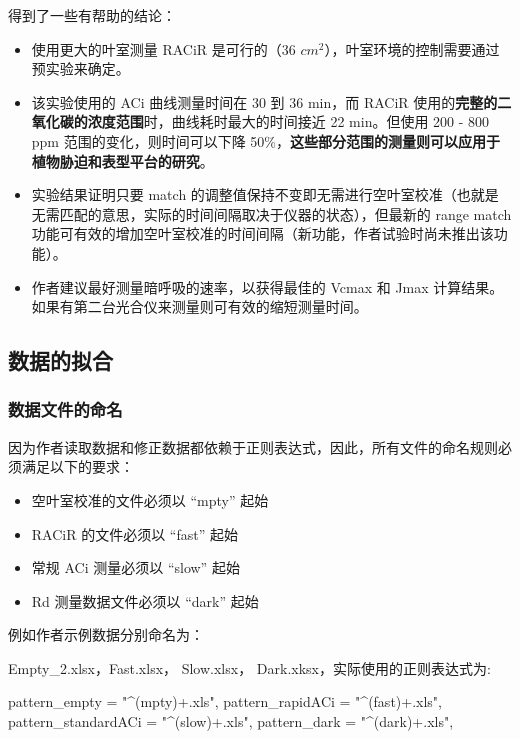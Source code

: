 \documentclass[
]{krantz}
\makeatletter
\newenvironment{Shaded}{\begin{snugshade}}{\end{snugshade}}
\newcommand{\NormalTok}[1]{#1}
\newcommand{\StringTok}[1]{\textcolor[rgb]{0.31,0.60,0.02}{#1}}
\newenvironment{kframe}{%
\medskip{}
\setlength{\fboxsep}{.8em}
 \def\at@end@of@kframe{}%
 \ifinner\ifhmode%
  \def\at@end@of@kframe{\end{minipage}}%
  \begin{minipage}{\columnwidth}%
 \fi\fi%
 \def\FrameCommand##1{\hskip\@totalleftmargin \hskip-\fboxsep
 \colorbox{shadecolor}{##1}\hskip-\fboxsep
     \hskip-\linewidth \hskip-\@totalleftmargin \hskip\columnwidth}%
 \MakeFramed {\advance\hsize-\width
   \@totalleftmargin\z@ \linewidth\hsize
   \@setminipage}}%
 {\par\unskip\endMakeFramed%
 \at@end@of@kframe}
\renewenvironment{Shaded}{\begin{kframe}}{\end{kframe}}
\makeatother
\begin{document}
得到了一些有帮助的结论：

\begin{itemize}
\item
  使用更大的叶室测量 RACiR 是可行的（36 \(cm^2\)），叶室环境的控制需要通过预实验来确定。
\item
  该实验使用的 ACi 曲线测量时间在 30 到 36 min，而 RACiR 使用的\textbf{完整的二氧化碳的浓度范围}时，曲线耗时最大的时间接近 22 min。但使用 200 - 800 ppm 范围的变化，则时间可以下降 50\%，\textbf{这些部分范围的测量则可以应用于植物胁迫和表型平台的研究}。
\item
  实验结果证明只要 match 的调整值保持不变即无需进行空叶室校准（也就是无需匹配的意思，实际的时间间隔取决于仪器的状态），但最新的 range match 功能可有效的增加空叶室校准的时间间隔（新功能，作者试验时尚未推出该功能）。
\item
  作者建议最好测量暗呼吸的速率，以获得最佳的 Vcmax 和 Jmax 计算结果。如果有第二台光合仪来测量则可有效的缩短测量时间。
\end{itemize}

\hypertarget{conifer-fit-racir}{%
\subsection{数据的拟合}\label{conifer-fit-racir}}

\hypertarget{name-files}{%
\subsubsection{数据文件的命名}\label{name-files}}

因为作者读取数据和修正数据都依赖于正则表达式，因此，所有文件的命名规则必须满足以下的要求：

\begin{itemize}
\item
  空叶室校准的文件必须以 ``mpty'' 起始
\item
  RACiR 的文件必须以 ``fast'' 起始
\item
  常规 ACi 测量必须以 ``slow'' 起始
\item
  Rd 测量数据文件必须以 ``dark'' 起始
\end{itemize}

例如作者示例数据分别命名为：

Empty\_2.xlsx，Fast.xlsx， Slow.xlsx， Dark.xksx，实际使用的正则表达式为:

\begin{Shaded}
\begin{Highlighting}[]
\NormalTok{pattern_empty       =}\StringTok{ "^(mpty)+.xls"}\NormalTok{,      }
\NormalTok{pattern_rapidACi    =}\StringTok{ "^(fast)+.xls"}\NormalTok{,      }
\NormalTok{pattern_standardACi =}\StringTok{ "^(slow)+.xls"}\NormalTok{,      }
\NormalTok{pattern_dark        =}\StringTok{ "^(dark)+.xls"}\NormalTok{,}
\end{Highlighting}
\end{Shaded}
\end{document}
